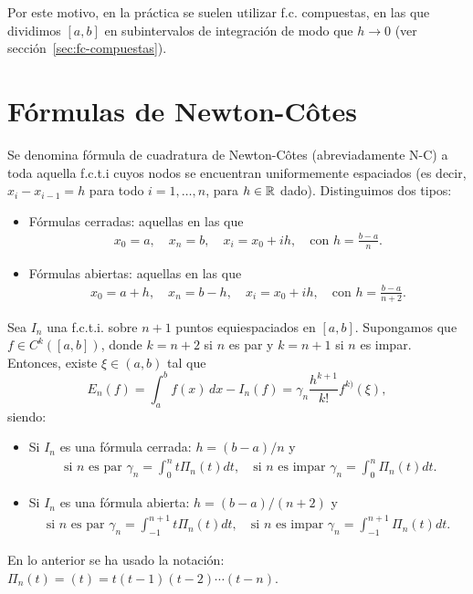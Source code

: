 Por este motivo, en la práctica se suelen utilizar f.c. compuestas, en
las que dividimos $[a,b]$ en subintervalos de integración de modo que
$h\to 0$ (ver sección~\ref{sec:fc-compuestas}).

\section{Fórmulas de Newton-Côtes}
\label{sec:formulas-de-newton}

\begin{definition}
  \label{def:1}
  Se denomina fórmula de cuadratura de Newton-Côtes (abreviadamente
  N-C) a toda aquella f.c.t.i cuyos nodos se encuentran
  uniformemente espaciados (es decir, $x_{i}-x_{i-1}=h$ para todo
  $i=1,\dots,n$, para $h\in\operatorname{{\mathbb R}}$ dado). Distinguimos dos tipos:
  \begin{itemize}
  \item Fórmulas cerradas: aquellas en las que
    \begin{align*}
      x_0=a, \quad x_n=b, \quad x_i=x_0 + i h,
      \quad
      \text{con }  h=\frac{b-a}{n}.
    \end{align*}
  \item Fórmulas abiertas: aquellas en las que
    \begin{align*}
      x_0=a+h, \quad x_n=b- h, \quad x_i=x_0 + i h,
      \quad
      \text{con }  h=\frac{b-a}{n+2}.
    \end{align*}
  \end{itemize}
\end{definition}

\begin{theorem}
  \label{thm:error.formulas-nc}
  Sea $I_n$ una f.c.t.i. sobre $n+1$ puntos equiespaciados en
  $[a,b]$. Supongamos que $f\in C^k([a,b])$, donde $k=n+2$ si $n$ es par
  y $k=n+1$ si $n$ es impar. Entonces, existe $\xi\in(a,b)$ tal que
  \begin{equation}
    \label{eq:error-formulas-nc}
    E_n(f)=\int_a^bf(x)\,dx - I_n(f)
    = \gamma_n \frac{h^{k+1}}{k!}f^{k)}(\xi),
  \end{equation}
  siendo:
  \begin{itemize}
  \item Si $I_n$ es una fórmula cerrada: $h=(b-a)/n$ y
    \begin{align*}
      \text{ si $n$ es par }
      \gamma_n=\int_0^n t \Pi_n(t) dt,
      \quad \text{si $n$ es impar }
      \gamma_n=\int_0^n \Pi_n(t) dt.
    \end{align*}
  \item Si $I_n$ es una fórmula abierta: $h=(b-a)/(n+2)$ y
    \begin{align*}
      \text{si $n$ es par }
      \gamma_n=\int_{-1}^{n+1} t \Pi_n(t) dt,
      \quad \text{si $n$ es impar }
      \gamma_n=\int_{-1}^{n+1} \Pi_n(t) dt.
    \end{align*}
  \end{itemize}
  En lo anterior se ha usado la notación:
  $\Pi_n(t)=(t)=t(t-1)(t-2)\cdots (t-n)$.
\end{theorem}

